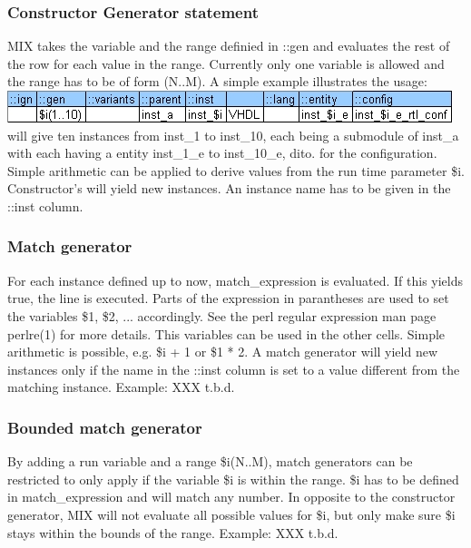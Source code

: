 \documentclass[a4paper,12pt]{article}
\begin{document}
\subsubsection{Constructor Generator statement}
MIX takes the variable and the range definied in ::gen and evaluates the rest of the row for each value in the range. Currently only one variable is allowed and the range has to be of form (N..M).\newline
\newline
A simple example illustrates the usage:\\
\includegraphics[scale=0.8]{images/gen_it.jpg}\\
will give ten instances from inst\_1 to inst\_10, each being a submodule of inst\_a with each having a entity inst\_1\_e to inst\_10\_e, dito. for the configuration. Simple arithmetic can be applied to derive values from the run time parameter \$i.\newline
Constructor's will yield new instances. An instance name has to be given in the ::inst column.\newline

\subsubsection{Match generator}
For each instance defined up to now, match\_expression is evaluated. If this yields true, the line is executed. Parts of the expression in parantheses are used to set the variables \$1, \$2, ... accordingly. See the perl regular expression man page perlre(1) for more details. This variables can be used in the other cells. Simple arithmetic is possible, e.g. {\$i + 1} or {\$1 * 2}.\newline
A match generator will yield new instances only if the name in the ::inst column is set to a value different from the matching instance.\newline
\newline
Example:\newline
\newline
XXX t.b.d.\newline

\subsubsection{Bounded match generator}
By adding a run variable and a range \$i(N..M), match generators can be restricted to only apply if the variable \$i is within the range. \$i has to be defined in match\_expression and will match any number.\newline
\newline
In opposite to the constructor generator, MIX will not evaluate all possible values for \$i, but only make sure \$i stays within the bounds of the range.\newline
\newline
Example:\newline
\newline
XXX t.b.d.\newline
\end{document}
